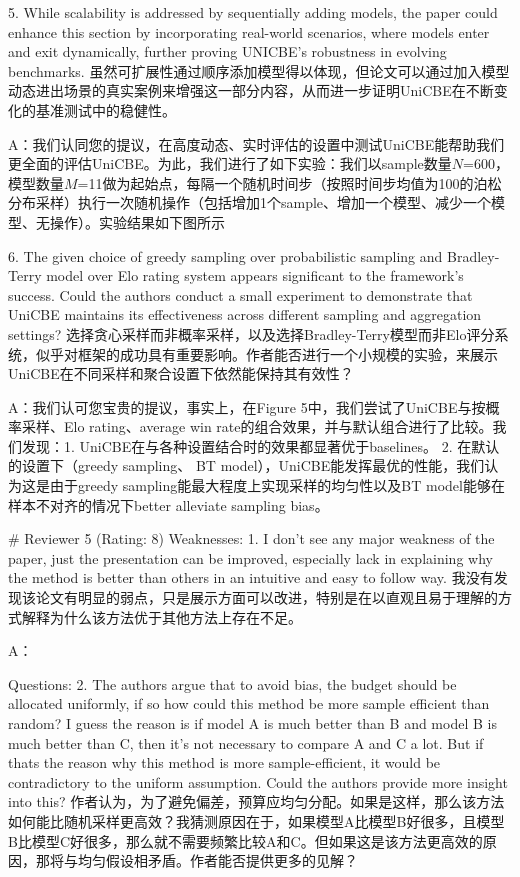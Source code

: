 5. While scalability is addressed by sequentially adding models, the paper could enhance this section by incorporating real-world scenarios, where models enter and exit dynamically, further proving UNICBE’s robustness in evolving benchmarks.
虽然可扩展性通过顺序添加模型得以体现，但论文可以通过加入模型动态进出场景的真实案例来增强这一部分内容，从而进一步证明UniCBE在不断变化的基准测试中的稳健性。

A：我们认同您的提议，在高度动态、实时评估的设置中测试UniCBE能帮助我们更全面的评估UniCBE。为此，我们进行了如下实验：我们以sample数量$N$=600，模型数量$M$=11做为起始点，每隔一个随机时间步（按照时间步均值为100的泊松分布采样）执行一次随机操作（包括增加1个sample、增加一个模型、减少一个模型、无操作）。实验结果如下图所示


6. The given choice of greedy sampling over probabilistic sampling and Bradley-Terry model over Elo rating system appears significant to the framework’s success. Could the authors conduct a small experiment to demonstrate that UniCBE maintains its effectiveness across different sampling and aggregation settings?
选择贪心采样而非概率采样，以及选择Bradley-Terry模型而非Elo评分系统，似乎对框架的成功具有重要影响。作者能否进行一个小规模的实验，来展示UniCBE在不同采样和聚合设置下依然能保持其有效性？

A：我们认可您宝贵的提议，事实上，在Figure 5中，我们尝试了UniCBE与按概率采样、Elo rating、average win rate的组合效果，并与默认组合进行了比较。我们发现：1. UniCBE在与各种设置结合时的效果都显著优于baselines。 2. 在默认的设置下（greedy sampling、 BT model），UniCBE能发挥最优的性能，我们认为这是由于greedy sampling能最大程度上实现采样的均匀性以及BT model能够在样本不对齐的情况下better alleviate sampling bias。

# Reviewer 5 (Rating: 8)
Weaknesses:
1. I don't see any major weakness of the paper, just the presentation can be improved, especially lack in explaining why the method is better than others in an intuitive and easy to follow way.
我没有发现该论文有明显的弱点，只是展示方面可以改进，特别是在以直观且易于理解的方式解释为什么该方法优于其他方法上存在不足。

A：

Questions:
2. The authors argue that to avoid bias, the budget should be allocated uniformly, if so how could this method be more sample efficient than random? I guess the reason is if model A is much better than B and model B is much better than C, then it's not necessary to compare A and C a lot. But if thats the reason why this method is more sample-efficient, it would be contradictory to the uniform assumption. Could the authors provide more insight into this?
作者认为，为了避免偏差，预算应均匀分配。如果是这样，那么该方法如何能比随机采样更高效？我猜测原因在于，如果模型A比模型B好很多，且模型B比模型C好很多，那么就不需要频繁比较A和C。但如果这是该方法更高效的原因，那将与均匀假设相矛盾。作者能否提供更多的见解？

